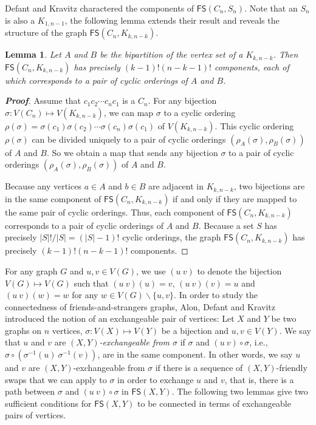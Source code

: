 \documentclass[11pt]{article}
\newtheorem{lem}[thm]{Lemma}%
\newcommand{\FS}{\mathsf{FS}}
\begin{document}
 Defant and Kravitz \cite{DK} charactered the components of $\FS(C_n,S_n)$. Note that an $S_n$ is also a $K_{1,n-1}$,  the following lemma extends their result and reveals the structure of the graph $\FS(C_n,K_{k,n-k})$.

\begin{lem}\label{23} Let $A$ and $B$ be the bipartition of the vertex set of a $K_{k,n-k}$. 
 Then $\FS(C_n,K_{k,n-k})$ has precisely $(k-1)!(n-k-1)!$ components, each of which corresponds to a pair of cyclic orderings of $A$ and $B$.
\end{lem}
\begin{proof}[\bfseries{Proof}]
  Assume that $c_1c_2\cdots c_nc_1$ is a $C_n$. For any bijection $\sigma: V(C_n)\mapsto V(K_{k,n-k})$, we can map $\sigma$  to 
a cyclic ordering $\rho(\sigma)=\sigma(c_1)\sigma(c_2)\cdots \sigma(c_n)\sigma(c_1)$ of $V(K_{k,n-k})$. This cyclic ordering $\rho(\sigma)$ can be divided uniquely to a pair of cyclic orderings $(\rho_A(\sigma),\rho_B(\sigma))$ of $A$ and $B$. So we obtain a map that sends any bijection $\sigma$ to a pair of cyclic orderings $(\rho_A(\sigma),\rho_B(\sigma))$ of $A$ and $B$. 

 Because any vertices $a\in A$ and $b\in B$ are adjacent in $K_{k,n-k}$, two bijections are in the same component of $\FS(C_n,K_{k,n-k})$ if and only if they are mapped to the same pair of cyclic orderings. Thus, each component of $\FS(C_n,K_{k,n-k})$ corresponds  to a pair of cyclic orderings of $A$ and $B$. Because a set $S$ has precisely
 $|S|! / |S|=(|S|-1)!$ cyclic orderings, the graph
$\FS(C_n,K_{k,n-k})$ has precisely $(k-1)!(n-k-1)!$ components.
\end{proof}

For any graph $G$ and $u,v\in V(G)$, we use $(u \ v)$ to denote the bijection  $V(G) \mapsto V(G)$ such that $(u \ v) (u)=v$, $(u \ v) (v)=u$ and $(u \ v) (w)=w$ for any $w\in V(G)\backslash \{u,v\}$.
In order to study the connectedness of friends-and-strangers graphs,  Alon, Defant and Kravitz \cite{ADK} introduced the notion of an exchangeable pair of vertices:
 Let $X$ and $Y$ be two graphs on $n$ vertices,   $\sigma:V(X)\mapsto V(Y)$ be a bijection and 
 $u,v \in V(Y)$. 
 We say that $u$ and $v$ are $(X,Y)${\it-exchangeable from $\sigma$} if $\sigma$ and $(u \ v) \circ \sigma$, i.e., $\sigma\circ (\sigma^{-1}(u)\ \sigma^{-1}(v))$, are in the same component. In other words,  we say $u$ and $v$ are $(X,Y)$-exchangeable from $\sigma$ if there  is  a  sequence of
$(X,Y)$-friendly swaps that we can apply to $\sigma$ in order to exchange $u$ and $v$, that is, there is a  path between $\sigma$ and $(u \ v) \circ \sigma$ in $\mathsf{FS}(X,Y)$. 
   The following   two lemmas give  two sufficient conditions for $\mathsf{FS}(X,Y)$ to be connected in terms of exchangeable pairs of vertices.  
\end{document}
